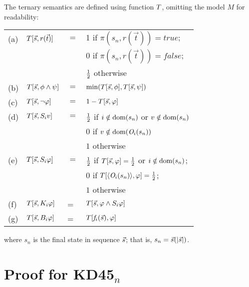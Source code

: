 \documentclass[letterpaper]{article} %
\begin{document}
\begin{definition}
The ternary semantics are defined using function $T$, omitting the model $M$ for readability:

\vspace{2mm} 
\noindent
\begin{tabular}{l@{~~}l@{~~}l@{~~}l}
 (a) & $T[\Vec{s}, r(\Vec{t})]$ & $=$ & 1 if $\pi(s_n, r(\Vec{t})) = true$;\\
     &                          &     & 0 if $\pi(s_n, r(\Vec{t})) = false$;\\
     &                          &     & $\frac{1}{2}$ otherwise\\[1mm] 
 (b) & $T[\Vec{s}, \phi \land \psi]$ & $=$ & $\min(T[\Vec{s}, \phi], T[\Vec{s}, \psi])$\\[1mm]
 (c) & $T[\Vec{s}, \neg \varphi]$    & $=$ & $1 - T[\Vec{s}, \varphi]$\\[1mm]
 (d) & $T[\Vec{s}, S_i v]$           & $=$ & $\frac{1}{2}$ if $ i \notin \textrm{dom}(s_n)$ or $ v \notin  \textrm{dom}(s_n)$\\[1mm]
     &                          &   & $0$ if $v \notin \textrm{dom}(\mathit{O}_i(s_n))$\\
     &                          &   & $1$ otherwise     \\
 (e) & $T[\Vec{s}, S_i \varphi]$    
 & $=$ & $\frac{1}{2}$ if $T[\Vec{s},\varphi] = \frac{1}{2}$ or $ i \notin \textrm{dom}(s_n)$;\\
     &                          &   & $0$ if $T[\langle\mathit{O}_i(s_n)\rangle, \varphi] = \frac{1}{2}$;\\
     &                          &   & $1$ otherwise\\[1mm]
  (f) & $T[\Vec{s}, K_i \varphi]$ & = & $ T[\Vec{s}, \varphi \land S_i\varphi]$\\[1mm]
  (g) & $T[\Vec{s}, B_i \varphi]$ & = & $ T[\mathit{f}_i(\Vec{s}), \varphi]$
\end{tabular}
\vspace{2mm} 

\noindent
where $s_n$ is the final state in sequence $\Vec{s}$; that is, $s_n = \Vec{s}(|\Vec{s}|)$.
\end{definition}

\section{Proof for KD45$_n$}
\end{document}
